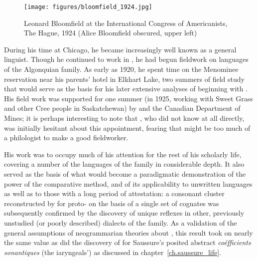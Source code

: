 \begin{wrapfigure}{r}{.35\textwidth}
  \texttt{[image: figures/bloomfield\_1924.jpg]}
  \caption{Leonard Bloomfield at the International Congress of
    Americanists, The Hague, 1924 (Alice Bloomfield obscured, upper left)}
  \label{fig:ch.bloomfield.bloomfield_1924}
\end{wrapfigure}
During his time at Chicago, he became increasingly well known as a
general linguist. Though he continued to work in , he had
begun fieldwork on languages of the {Algonquian} family. As early as
1920, he spent time on the Menominee reservation near his parents'
hotel in Elkhart Lake, two summers of field study that would serve as
the basis for his later extensive analyses of  beginning
with \citealt{bloomfield24:menomini}. His field work was supported for
one summer (in 1925, working with Sweet Grass and other Cree people in
Saskatchewan) by {\Sapir} and the Canadian Department of Mines; it is
perhaps interesting to note that {\Sapir}, who did not know {\Bloomfield} at
all directly, was initially hesitant about this appointment, fearing
that {\Bloomfield} might be too much of a philologist to make a good
fieldworker.

His  work was to occupy much of his attention for the rest
of his scholarly life, covering a number of the languages of the
family in considerable depth. It also served as the basis of what
would become a paradigmatic demonstration of the power of the
comparative method, and of its applicability to unwritten languages as
well as to those with a long period of attestation: a consonant
cluster reconstructed by {\Bloomfield} for proto- on the basis
of a single set of cognates was subsequently confirmed by the
discovery of unique reflexes in other, previously unstudied (or poorly
described) dialects of the family. As a validation of the general
assumptions of neogrammarian theories about , this
result took on nearly the same value as did the discovery of 
for Saussure's posited abstract \textsl{coéfficients sonantiques} (the
iaryngeals') as discussed in chapter~\ref{ch.saussure_life}.

